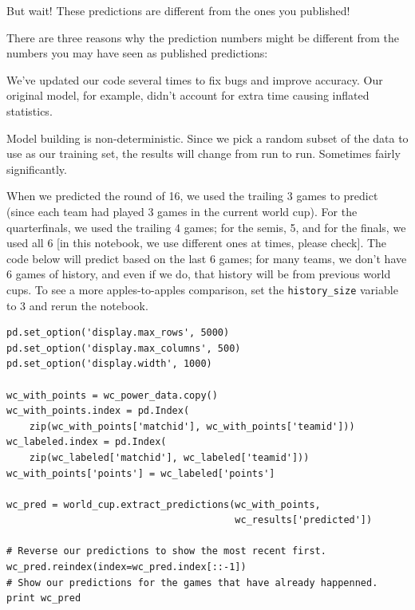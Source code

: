 \documentclass[12pt,fleqn]{article}\usepackage{../common}
\begin{document}
But wait! These predictions are different from the ones you published!

There are three reasons why the prediction numbers might be different from
the numbers you may have seen as published predictions:

We've updated our code several times to fix bugs and improve accuracy. Our
original model, for example, didn't account for extra time causing inflated
statistics.

Model building is non-deterministic. Since we pick a random subset of the
data to use as our training set, the results will change from run to
run. Sometimes fairly significantly.

When we predicted the round of 16, we used the trailing 3 games to predict
(since each team had played 3 games in the current world cup). For the
quarterfinals, we used the trailing 4 games; for the semis, 5, and for the
finals, we used all 6 [in this notebook, we use different ones at times,
please check]. The code below will predict based on the last 6 games; for
many teams, we don't have 6 games of history, and even if we do, that
history will be from previous world cups. To see a more apples-to-apples
comparison, set the \verb!history_size!  variable to 3 and rerun the
notebook.

\begin{verbatim}
pd.set_option('display.max_rows', 5000)
pd.set_option('display.max_columns', 500)
pd.set_option('display.width', 1000)

wc_with_points = wc_power_data.copy()
wc_with_points.index = pd.Index(
    zip(wc_with_points['matchid'], wc_with_points['teamid']))
wc_labeled.index = pd.Index(
    zip(wc_labeled['matchid'], wc_labeled['teamid']))
wc_with_points['points'] = wc_labeled['points']

wc_pred = world_cup.extract_predictions(wc_with_points, 
                                        wc_results['predicted'])

# Reverse our predictions to show the most recent first.
wc_pred.reindex(index=wc_pred.index[::-1])
# Show our predictions for the games that have already happenned.
print wc_pred
\end{verbatim}
\end{document}
